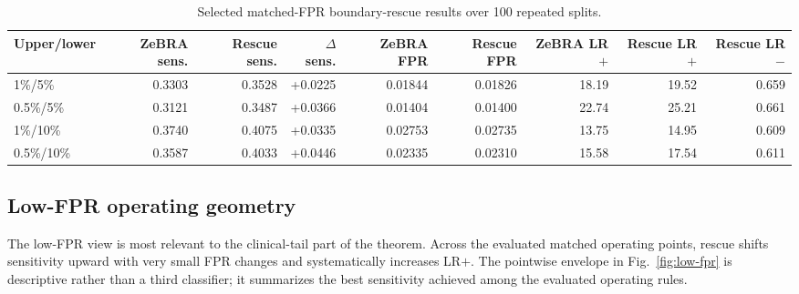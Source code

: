 \documentclass[journal]{IEEEtran}
\begin{document}
\begin{table}[!t]\caption{Selected matched-FPR boundary-rescue results over 100 repeated splits.}\label{tab:boundary-selected}\centering\footnotesize
\begin{tabular}{lrrrrrrrr}\toprule
Upper/lower & ZeBRA sens. & Rescue sens. & $\Delta$ sens. & ZeBRA FPR & Rescue FPR & ZeBRA LR$+$ & Rescue LR$+$ & Rescue LR$-$\\\midrule
1\%/5\% & 0.3303 & 0.3528 & +0.0225 & 0.01844 & 0.01826 & 18.19 & 19.52 & 0.659\\
0.5\%/5\% & 0.3121 & 0.3487 & +0.0366 & 0.01404 & 0.01400 & 22.74 & 25.21 & 0.661\\
1\%/10\% & 0.3740 & 0.4075 & +0.0335 & 0.02753 & 0.02735 & 13.75 & 14.95 & 0.609\\
0.5\%/10\% & 0.3587 & 0.4033 & +0.0446 & 0.02335 & 0.02310 & 15.58 & 17.54 & 0.611\\\bottomrule
\end{tabular}\end{table}

\subsection{Low-FPR operating geometry}
The low-FPR view is most relevant to the clinical-tail part of the theorem. Across the evaluated matched operating points, rescue shifts sensitivity upward with very small FPR changes and systematically increases LR$+$. The pointwise envelope in Fig.~\ref{fig:low-fpr} is descriptive rather than a third classifier; it summarizes the best sensitivity achieved among the evaluated operating rules.
\end{document}
